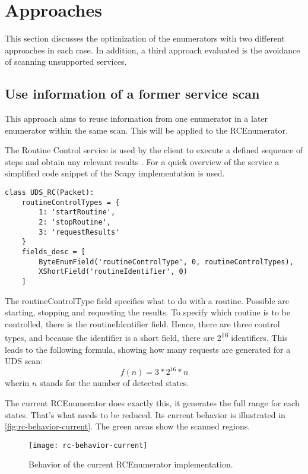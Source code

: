 \section{Approaches}

This section discusses the optimization of the enumerators with two different approaches in each case. In addition, a third approach evaluated is the avoidance of scanning unsupported services. 

\subsection{Use information of a former service scan}

This approach aims to reuse information from one enumerator in a later enumerator within the same scan. This will be applied to the RCEnumerator.

The Routine Control service is used by the client to execute a defined sequence of steps and obtain any relevant results \cite{iso14229}. For a quick overview of the service a simplified code snippet of the Scapy implementation is used.

\begin{samepage}
\begin{verbatim}
class UDS_RC(Packet):
    routineControlTypes = {
        1: 'startRoutine',
        2: 'stopRoutine',
        3: 'requestResults'
    }
    fields_desc = [
        ByteEnumField('routineControlType', 0, routineControlTypes),
        XShortField('routineIdentifier', 0)
    ]
\end{verbatim}
\end{samepage}

The routineControlType field specifies what to do with a routine. Possible are starting, stopping and requesting the results. To specify which routine is to be controlled, there is the routineIdentifier field. Hence, there are three control types, and because the identifier is a short field, there are 2\textsuperscript{16} identifiers. This leads to the following formula, showing how many requests are generated for a UDS scan:
\[f(n)=3 * 2^{16} * n\]
wherin $n$ stands for the number of detected states.

The current RCEnumerator does exactly this, it generates the full range for each states. That's what needs to be reduced. Its current behavior is illustrated in \autoref{fig:rc-behavior-current}. The green areas show the scanned regions.

\begin{figure}[h]
    \centering
    \texttt{[image: rc-behavior-current]}
    \caption{Behavior of the current RCEnumerator implementation.}
    \label{fig:rc-behavior-current}
\end{figure}

